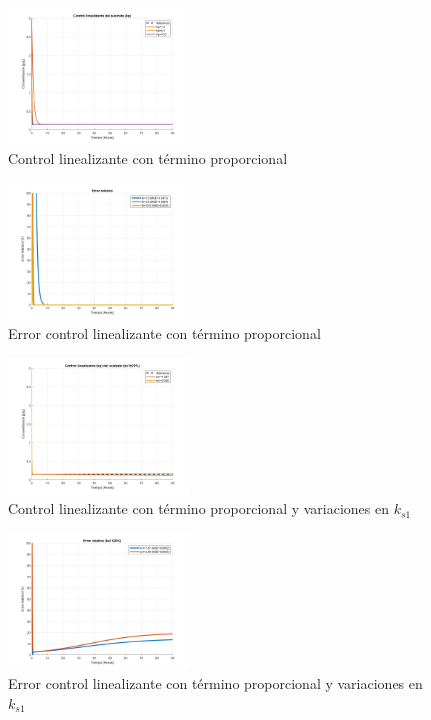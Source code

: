 \documentclass[letterpaper, 10 pt, conference]{ieeeconf}  %
\begin{document}
\begin{figure}[H]
  \centering
  \includegraphics[width=0.43\textwidth]{./Images_tp3/lin_kp.png}
  \caption{Control linealizante con término proporcional}
\end{figure}
\begin{figure}[H]
  \centering
  \includegraphics[width=0.43\textwidth]{./Images_tp3/lin_kp_err.png}
  \caption{Error control linealizante con término proporcional}
\end{figure}

\begin{figure}[H]
  \centering
  \includegraphics[width=0.43\textwidth]{./Images_tp3/lin_kp_ks1.png}
  \caption{Control linealizante con término proporcional y variaciones en $k_{s1}$}
\end{figure}
\begin{figure}[H]
  \centering
  \includegraphics[width=0.43\textwidth]{./Images_tp3/lin_kp_err_ks1.png}
  \caption{Error control linealizante con término proporcional y variaciones en $k_{s1}$}
\end{figure}
\end{document}
